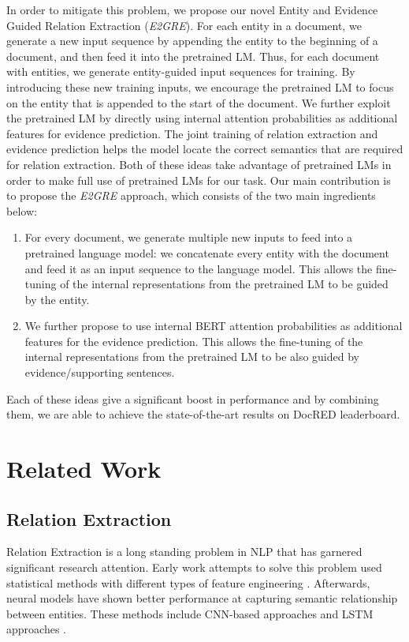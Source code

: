 \documentclass[11pt,a4paper]{article}
\begin{document}
In order to mitigate this problem, we propose our novel Entity and Evidence Guided Relation Extraction ({\em E2GRE}).
For each entity in a document, we generate a new input sequence by appending the entity to the beginning of a document, and then feed it into the pretrained LM. 
Thus, for each document with  entities, we generate  entity-guided input sequences for training.
By introducing these new training inputs, we encourage the pretrained LM to focus on the entity that is appended to the start of the document. 
We further exploit the pretrained LM by directly using internal attention probabilities as additional features for evidence prediction. 
The joint training of relation extraction and evidence prediction helps the model locate the correct semantics that are required for relation extraction. 
Both of these ideas take advantage of pretrained LMs in order to make full use of pretrained LMs for our task. 
Our main contribution is to propose the {\em E2GRE} approach, which consists of the two main ingredients below:

\begin{enumerate}

    \item  For every document, we generate multiple new inputs to feed into a pretrained language model: we concatenate every entity with the document and feed it as an input sequence to the language model. This allows the fine-tuning of the internal representations from the pretrained LM to be guided by the entity. 
\item We further propose to use internal BERT attention probabilities as additional features for the evidence prediction.
This allows the fine-tuning of the internal representations from the pretrained LM to be also guided by evidence/supporting sentences. 


\end{enumerate}

Each of these ideas give a significant boost in performance and by combining them, we are able to achieve the state-of-the-art results on DocRED leaderboard. 


\section{Related Work}
\subsection{Relation Extraction}
Relation Extraction is a long standing problem in NLP that has garnered significant research attention. 
Early work attempts to solve this problem used statistical methods with different types of feature engineering \cite{zelenko-kernel,bunescu-mooney-2005-shortest}. 
Afterwards, neural models have shown better performance at capturing semantic relationship between entities.
These methods include CNN-based approaches \cite{zeng-etal-2014-relation,wang-etal-2016-relation} and LSTM approaches \cite{cai-etal-2016-bidirectional}.
\end{document}
